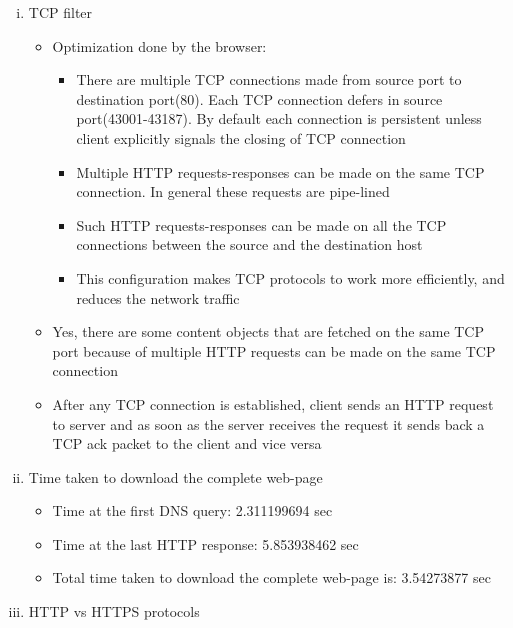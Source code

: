 \documentclass{article}
\begin{document}
\begin{enumerate}[a)]
\begin{enumerate}[i)]
\begin{itemize}
                    \end{itemize}{}
                \item TCP filter
                    \begin{itemize}
                        \item Optimization done by the browser:
                        \begin{itemize}
                            \item There are multiple TCP connections made from source port to destination port(80). Each TCP connection defers in source port(43001-43187). By default each connection is persistent unless client explicitly signals the closing of TCP connection \item Multiple HTTP requests-responses can be made on the same TCP connection. In general these requests are pipe-lined
                            \item Such HTTP requests-responses can be made on all the TCP connections between the source and the destination host
                            \item This configuration makes TCP protocols to work more efficiently, and reduces the network traffic
                        \end{itemize}{}
                        \item Yes, there are some content objects that are fetched on the same TCP port because of multiple HTTP requests can be made on the same TCP connection
                        \item After any TCP connection is established, client sends an HTTP request to server and as soon as the server receives the request it sends back a TCP ack packet to the client and vice versa
                    \end{itemize}{}
                \item Time taken to download the complete web-page
                    \begin{itemize}
                        \item Time at the first DNS query: 2.311199694 sec
                        \item Time at the last HTTP response: 5.853938462 sec
                        \item Total time taken to download the complete web-page is: 3.54273877 sec
                    \end{itemize}{}
                \item HTTP vs HTTPS protocols
                    \begin{itemize}

\end{itemize}
\end{enumerate}
\end{enumerate}
\end{document}
